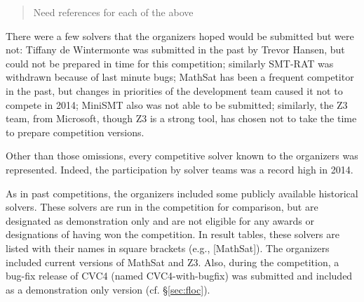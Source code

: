 \documentclass[twoside,11pt]{article}
\newcommand{\comment}[2]{\begin{quote}\sc #1\marginpar{\textcolor{red}{$\ast^{\mbox{#2}}$}}\end{quote}}
\newcommand{\davidc}[1]{\comment{#1}{DC}}
\begin{document}
\davidc{Need references for each of the above}

There were a few solvers that the organizers hoped would be submitted but were not: Tiffany de Wintermonte was submitted in the past by Trevor Hansen, but could not be prepared in time for this competition; similarly SMT-RAT was withdrawn because of last minute bugs; MathSat has been a frequent competitor in the past, but changes in priorities of the development team caused it not to compete in 2014; MiniSMT also was not able to be submitted; similarly, the Z3 team, from Microsoft, though Z3 is a strong tool, has chosen not to take the time to prepare competition versions.

Other than those omissions, every competitive solver known to the organizers was represented. Indeed, the participation by solver teams was a record high in 2014. 

As in past competitions, the organizers included some publicly available historical solvers. These solvers are run in the competition for comparison, but are designated as demonstration only and are not eligible for any awards or designations of having won the competition. In result tables, these solvers are listed with their names in square brackets (e.g., [MathSat]). The organizers included current versions of MathSat and Z3. Also, during the competition, a bug-fix release of CVC4 (named CVC4-with-bugfix) was submitted and included as a demonstration only version (cf. \S\ref{sec:floc}).
\end{document}
